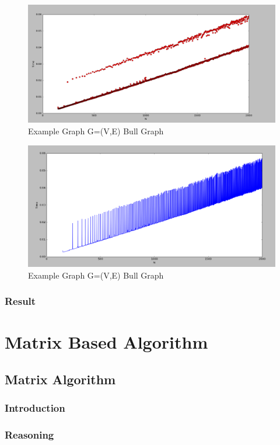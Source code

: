 \begin{figure}[H]
\centering
\includegraphics[scale=0.3]{e2000.png}
\caption{Example Graph G=(V,E) Bull Graph}
\end{figure}

\begin{figure}[H]
\centering
\includegraphics[scale=0.3]{e2000b.png}
\caption{Example Graph G=(V,E) Bull Graph}
\end{figure}


\subsubsection{Result}

\section{Matrix Based Algorithm}
\subsection{Matrix Algorithm}
\subsubsection{Introduction}
\subsubsection{Reasoning}
